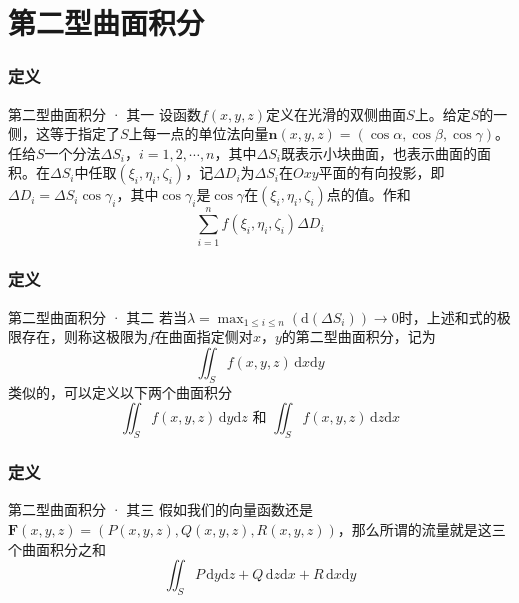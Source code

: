 \documentclass[xetex]{beamer}
\begin{document}
    \section{第二型曲面积分}

    \begin{frame}
        \frametitle{定义}
    
        \begin{block}{第二型曲面积分 · 其一}
            设函数$f(x,y,z)$定义在光滑的双侧曲面$S$上。给定$S$的一侧，这等于指定了$S$上每一点的单位法向量$\mathbf{n}(x,y,z)=(\cos\alpha,\cos\beta,\cos\gamma)$。任给$S$一个分法$\Delta S_i$，$i=1,2,\cdots,n$，其中$\Delta S_i$既表示小块曲面，也表示曲面的面积。在$\Delta S_i$中任取$(\xi_i,\eta_i,\zeta_i)$，记$\Delta D_i$为$\Delta S_i$在$Oxy$平面的有向投影，即$\Delta D_i=\Delta S_i\cos\gamma_i$，其中$\cos\gamma_i$是$\cos\gamma$在$(\xi_i,\eta_i,\zeta_i)$点的值。作和
            $$\sum_{i=1}^nf(\xi_i,\eta_i,\zeta_i)\Delta D_i$$

        \end{block}
    
    \end{frame}

    \begin{frame}
        \frametitle{定义}
    
        \begin{block}{第二型曲面积分 · 其二}
            若当$\displaystyle\lambda=\max_{1\leq i\leq n}\left(\mathrm{d}(\Delta S_i)\right)\to 0$时，上述和式的极限存在，则称这极限为\alert{$f$在曲面指定侧对$x$，$y$的第二型曲面积分}，记为$$\iint_Sf(x,y,z)\,\mathrm{d}x\mathrm{d}y$$
            类似的，可以定义以下两个曲面积分
            $$\iint_Sf(x,y,z)\,\mathrm{d}y\mathrm{d}z\text{ 和 }\iint_Sf(x,y,z)\,\mathrm{d}z\mathrm{d}x$$
        \end{block}
    
    \end{frame}

    \begin{frame}
        \frametitle{定义}
    
        \begin{block}{第二型曲面积分 · 其三}
            假如我们的向量函数还是$\mathbf{F}(x,y,z)=\left(P(x,y,z),Q(x,y,z),R(x,y,z)\right)$，那么所谓的\alert{流量}就是这三个曲面积分之和
            $$\iint_SP\,\mathrm{d}y\mathrm{d}z+Q\,\mathrm{d}z\mathrm{d}x+R\,\mathrm{d}x\mathrm{d}y$$
        \end{block}
    
    \end{frame}
\end{document}

